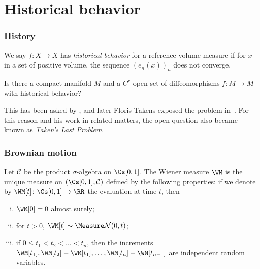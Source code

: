 \documentclass[shortlabels, 9pt, aspectratio=2013]{beamer}
\begin{document}
\section{Historical behavior}

\begin{frame}
  \frametitle{History}
  \begin{definition}
    We say \(f \colon X \to X\) has \emph{historical behavior} for a reference volume measure if for \(x\) in a set of positive volume, the sequence \((e_n(x))_n\) does not converge.
  \end{definition}
  \begin{question}[open]
    Is there a compact manifold \(M\) and a \(C^r\)-open set of diffeomorphisms \(f \colon M \to M\) with historical behavior?
  \end{question}
  This has been asked by \textcite{ruelleHistoricalBehaviourSmooth2001}, and later Floris Takens exposed the problem in~\textcite{takensOrbitsHistoricBehaviour2008}. For this reason and his work in related matters, the open question also became known as \textit{Taken's Last Problem}.
\end{frame}

\begin{frame}
  \frametitle{Brownian motion}
  \begin{definition}
    Let \(\mathcal{C}\) be the product \(\sigma\)-algebra on \(\CWPS\). The Wiener measure \(\WM\) is the unique measure on \((\CWPS, \mathcal{C})\) defined by the following properties: if we denote by \(\WM[t] \colon \CWPS \to \RR\) the evaluation at time \(t\), then
    \begin{enumerate}[(i)]
    \item \(\WM[0] = 0\) almost surely;
    \item for \(t > 0\), \(\WM[t] \sim \Normal[0][t]\);
    \item if \(0 \leq t_1 < t_2 < \dots < t_n\), then the increments \(\WM[t_1], \WM[t_2] - \WM[t_1], \dots, \WM[t_n] - \WM[t_{n - 1}]\) are independent random variables.
    \end{enumerate}
  \end{definition}
\end{frame}
\end{document}

